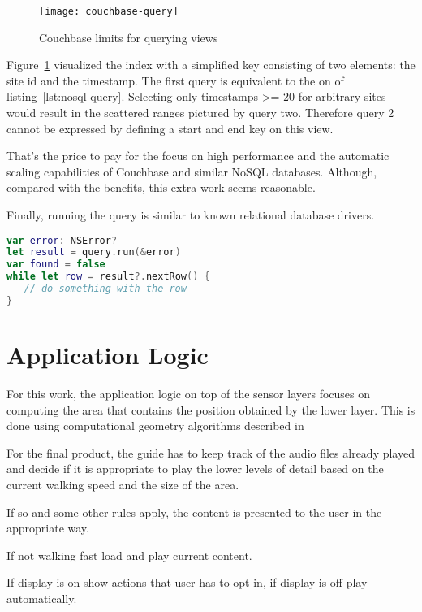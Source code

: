 \begin{figure}[H]
\centering
\texttt{[image: couchbase-query]}
\caption{Couchbase limits for querying views}
\label{fig:couchbase-query}
\end{figure}

Figure~\ref{fig:couchbase-query} visualized the index with a simplified key consisting of two elements: the site id and the timestamp. The first query is equivalent to the on of listing~\ref{lst:nosql-query}. Selecting only timestamps >= 20 for arbitrary sites would result in the scattered ranges pictured by query two. Therefore query 2 cannot be expressed by defining a start and end key on this view.

That's the price to pay for the focus on high performance and the automatic scaling capabilities of Couchbase and similar NoSQL databases. Although, compared with the benefits, this extra work seems reasonable.

Finally, running the query is similar to known relational database drivers. 

\begin{lstlisting}[basicstyle=\footnotesize,caption=Performing the NoSQL query,language=Swift]
var error: NSError?
let result = query.run(&error)
var found = false
while let row = result?.nextRow() {
   // do something with the row
}
\end{lstlisting}


\section{Application Logic}

For this work, the application logic on top of the sensor layers focuses on computing the area that contains the position obtained by the lower layer. This is done using computational geometry algorithms described in  %



For the final product, the guide has to keep track of the audio files already played and decide if it is appropriate to play the lower levels of detail based on the current walking speed and the size of the area.

If so and some other rules apply, the content is presented to the user in the appropriate way.

If not walking fast load and play current content.

If display is on show actions that user has to opt in, if display is off play automatically. 

